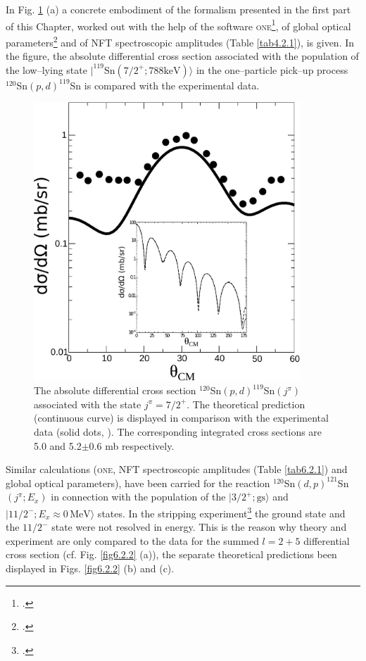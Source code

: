   
  In Fig. \ref{fig6.2.1} (a) a concrete embodiment of the formalism presented in the first part of this Chapter, worked out with the help of the software \textsc{one}\footnote{\cite{Potel:12b}.}, of global optical parameters\footnote{\cite{Dickey:82}.} and of NFT spectroscopic amplitudes (Table \ref{tab4.2.1}), is given. In the figure, the absolute differential cross section associated with the population of the low--lying state $|^{119}\text{Sn}(7/2^+;788 \text{keV})\rangle$ in the one--particle pick--up process $^{120}$Sn$(p,d)^{119}$Sn is compared with the experimental data.   
  
    \begin{figure}
    \centerline{\includegraphics*[width=10cm,angle=0]{C6/figs_C6/fig6_2_1x.pdf}}
    \caption{The absolute differential cross section $^{120}$Sn$(p,d)^{119}$Sn$(j^\pi)$ associated with the state $j^\pi=7/2^+$. The theoretical prediction (continuous curve) is displayed in comparison with the experimental data (solid dots,  \cite{Dickey:82}). The corresponding integrated cross sections are 5.0 and 5.2$\pm0.6$ mb respectively. }\label{fig6.2.1}
    \end{figure}
  Similar calculations (\textsc{one}, NFT spectroscopic amplitudes (Table \ref{tab6.2.1}) and global optical parameters), have been carried for the reaction $^{120}$Sn$(d,p)^{121}$Sn $(j^{\pi};E_x)$ in connection with the population 	of the $|3/2^+; \text{gs}\rangle$ and $|11/2^-;E_x\approx 0\, \text{MeV}\rangle$ states.
  In the stripping  experiment\footnote{\cite{Bechara:75}.} the 	ground state and the $11/2^-$ state were not resolved in energy. This is the reason why theory and experiment are only compared to the data for the summed $l=2+5$ differential cross section (cf. Fig. \ref{fig6.2.2} (a)), the separate theoretical predictions been displayed in Figs. \ref{fig6.2.2} (b) and (c).
